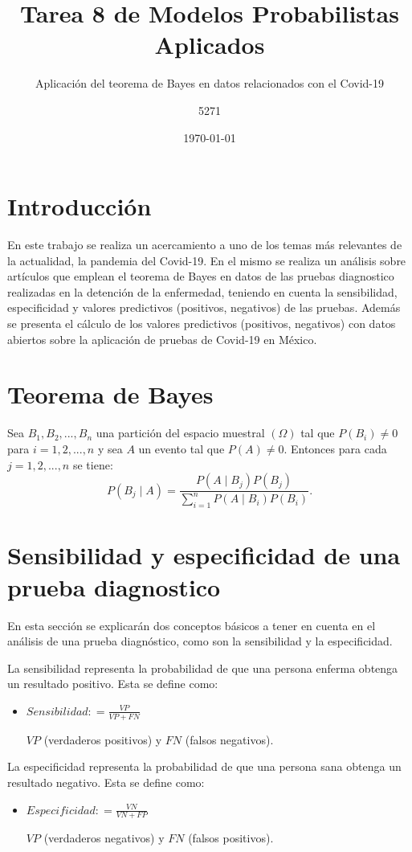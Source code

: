 \documentclass{article}
\title{Tarea 8 de Modelos Probabilistas Aplicados}
\subtitle{Aplicación del teorema de Bayes en datos relacionados con el Covid-19}
\author{5271}
\date{\today}
\begin{document}
\maketitle

\section{Introducción}

En este trabajo se realiza un acercamiento a uno de los temas más relevantes de la actualidad, la pandemia del Covid-19. En el mismo se realiza un análisis sobre artículos que emplean el teorema de Bayes en datos de las pruebas diagnostico realizadas en la detención de la enfermedad, teniendo en cuenta la sensibilidad, especificidad y valores predictivos (positivos, negativos) de las pruebas. Además se presenta el cálculo de los valores predictivos (positivos, negativos) con datos abiertos sobre la aplicación de pruebas de Covid-19 en México.    

\section{Teorema de Bayes}
Sea $B_{1},B_{2},...,B_{n}$ una partición del espacio muestral $(\Omega)$ tal que $P(B_{i})\neq 0$ para $i=1,2,...,n$ y sea $A$ un evento tal que $P(A)\neq 0$. Entonces para cada $j=1,2,...,n$ se tiene:
\begin{equation} \label{eq:bayes}
P(B_j \mid A) = \frac{P(A \mid B_j)P(B_j) }{\sum_{i = 1}^n P(A \mid B_i)P(B_i) }.
\end{equation}
\section{Sensibilidad y especificidad de una prueba diagnostico}
En esta sección se explicarán dos conceptos básicos a tener en cuenta en el análisis de una prueba diagnóstico, como son la sensibilidad y la especificidad.

La sensibilidad representa la probabilidad de que una persona enferma obtenga un resultado positivo. Esta se define como:
\begin{itemize}
    \item $Sensibilidad: = \frac{VP}{VP+FN}$
    
 $VP$ (verdaderos positivos) y $FN$ (falsos negativos).
\end{itemize}
La especificidad representa la probabilidad de que una persona sana obtenga un resultado negativo. Esta se define como:
\begin{itemize}
    \item $Especificidad: = \frac{VN}{VN+FP}$
    
     $VP$ (verdaderos negativos) y $FN$ (falsos positivos).
\end{itemize}
 
\end{document}
